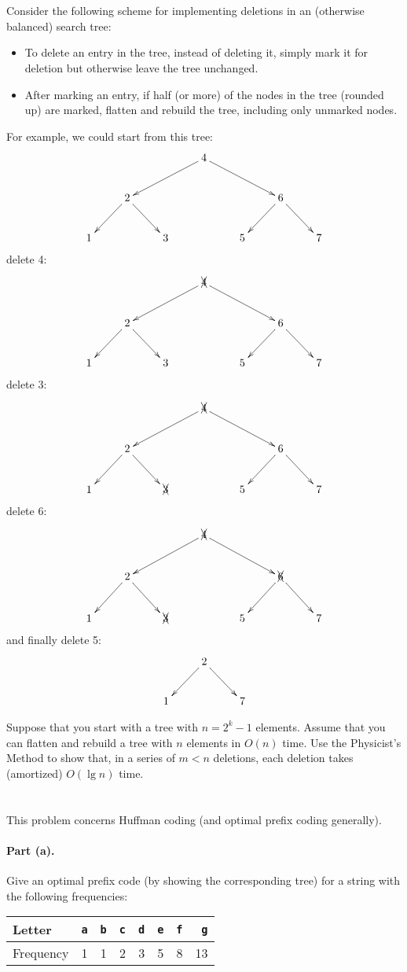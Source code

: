 \documentclass{article}
\newcommand{\Problem}[1][]{\ifthenelse{\equal{#1}{}}{}{\addtocounter{section}{#1}}\clearpage\section{}\setcounter{page}{1}}
\begin{document}
\Problem[3]

Consider the following scheme for implementing deletions in an (otherwise balanced) search tree:
\begin{itemize}
\item To delete an entry in the tree, instead of deleting it, simply mark it for deletion but otherwise leave the tree unchanged.
\item After marking an entry, if half (or more) of the nodes in the tree (rounded up) are marked, flatten and rebuild the tree, including only unmarked nodes.
\end{itemize}
For example, we could start from this tree:
\[
\xymatrix{
 & & & 4 \ar[dll] \ar[drr] \\
 & 2 \ar[dl] \ar[dr] & & & & 6 \ar[dl] \ar[dr] \\
 1 & & 3 & & 5 & & 7}
\]
delete 4:
\[
\xymatrix{
 & & & \xcancel 4 \ar[dll] \ar[drr] \\
 & 2 \ar[dl] \ar[dr] & & & & 6 \ar[dl] \ar[dr] \\
 1 & & 3 & & 5 & & 7}
\]
delete 3:
\[
\xymatrix{
 & & & \xcancel 4 \ar[dll] \ar[drr] \\
 & 2 \ar[dl] \ar[dr] & & & & 6 \ar[dl] \ar[dr] \\
 1 & & \xcancel 3 & & 5 & & 7}
\]
delete 6:
\[
\xymatrix{
 & & & \xcancel 4 \ar[dll] \ar[drr] \\
 & 2 \ar[dl] \ar[dr] & & & & \xcancel 6 \ar[dl] \ar[dr] \\
 1 & & \xcancel 3 & & 5 & & 7}
\]
and finally delete 5:
\[
\xymatrix{
 & 2 \ar[dl] \ar[dr] \\
 1 & & 7}
\]

Suppose that you start with a tree with $n = 2^k - 1$ elements.  Assume that you can flatten and rebuild a tree with $n$ elements in $O(n)$ time.  Use the Physicist's Method to show that, in a series of $m < n$ deletions, each deletion takes (amortized) $O(\lg n)$ time.

\Problem[2]

This problem concerns Huffman coding (and optimal prefix coding generally).

\paragraph{Part (a).}

Give an optimal prefix code (by showing the corresponding tree) for a string with the following frequencies:

\begin{tabular}{l|rrrrrrr}
  Letter & \texttt{a} & \texttt{b} & \texttt{c} & \texttt{d} & \texttt{e} & \texttt{f} & \texttt{g} \\
  \hline
  Frequency & 1 & 1 & 2 & 3 & 5 & 8 & 13
\end{tabular}
\end{document}
